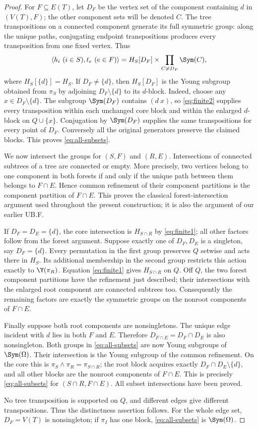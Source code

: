 \begin{proof}
For $F\subseteq E(T)$, let $D_F$ be the vertex set of the component
containing $d$ in $(V(T),F)$; the other component sets will be denoted
$C$. The tree transpositions on a connected component generate its full
symmetric group: along the unique paths, conjugating endpoint
transpositions produces every transposition from one fixed vertex.
Thus
\begin{equation}\label{eq:all-subsets}
\langle h_i\ (i\in S),t_e\ (e\in F)\rangle
= H_S[D_F]\times\prod_{C\ne D_F}\Sym(C),
\end{equation}
where $H_S[\{d\}]=H_S$. If $D_F\ne\{d\}$, then $H_S[D_F]$
is the Young subgroup obtained from $\pi_S$ by adjoining
$D_F\setminus\{d\}$ to its $d$-block. Indeed, choose any
$x\in D_F\setminus\{d\}$. The subgroup $\Sym(D_F)$ contains
$(d\ x)$, so \eqref{eq:finite2} supplies every transposition within
each unchanged core block and within the enlarged $d$-block on
$Q\cup\{x\}$. Conjugation by $\Sym(D_F)$ supplies the same
transpositions for every point of $D_F$. Conversely all the original
generators preserve the claimed blocks. This proves \eqref{eq:all-subsets}.

We now intersect the groups for $(S,F)$ and $(R,E)$. Intersections of
connected subtrees of a tree are connected or empty. More precisely,
two vertices belong to one component in both forests if and only if
the unique path between them belongs to $F\cap E$. Hence common
refinement of their component partitions is the component partition
of $F\cap E$. This proves the classical forest-intersection argument used throughout
the present construction; it is also the argument of our earlier UB.F.

If $D_F=D_E=\{d\}$, the core intersection is $H_{S\cap R}$
by \eqref{eq:finite1}; all other factors follow from the forest
argument. Suppose exactly one of $D_F,D_E$ is a singleton, say
$D_F=\{d\}$. Every permutation in the first group preserves $Q$
setwise and acts there in $H_S$. Its additional membership in the
second group restricts this action exactly to $\Y(\pi_R)$.
Equation \eqref{eq:finite1} gives $H_{S\cap R}$ on $Q$.
Off $Q$, the two forest component partitions have the refinement
just described; their intersections with the enlarged root component
are connected subtrees too. Consequently the remaining factors are
exactly the symmetric groups on the nonroot components of $F\cap E$.

Finally suppose both root components are nonsingletons. The unique
edge incident with $d$ lies in both $F$ and $E$. Therefore
$D_{F\cap E}=D_F\cap D_E$ is also nonsingleton. Both groups in
\eqref{eq:all-subsets} are now Young subgroups of $\Sym(\Omega)$.
Their intersection is the Young subgroup of the common refinement.
On the core this is $\pi_S\wedge\pi_R=\pi_{S\cap R}$;
the root block acquires exactly $D_F\cap D_E\setminus\{d\}$,
and all other blocks are the nonroot components of $F\cap E$.
This is precisely \eqref{eq:all-subsets} for $(S\cap R,F\cap E)$.
All subset intersections have been proved.

No tree transposition is supported on $Q$, and different edges give
different transpositions. Thus the distinctness assertion follows.
For the whole edge set, $D_F=V(T)$ is nonsingleton; if $\pi_I$
has one block, \eqref{eq:all-subsets} is $\Sym(\Omega)$.
\end{proof}

